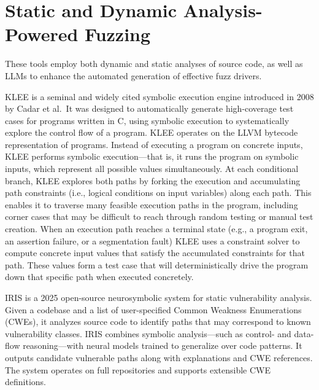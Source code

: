 \documentclass[
  a4paper,
]{scrreprt}
\theoremstyle{definition}
\theoremstyle{remark}
\begin{document}
\section{Static and Dynamic Analysis-Powered
Fuzzing}\label{static-and-dynamic-analysis-powered-fuzzing}

These tools employ both dynamic and static analyses of source code, as
well as LLMs to enhance the automated generation of effective fuzz
drivers.

KLEE \autocite{klee} is a seminal and widely cited symbolic execution
engine introduced in 2008 by Cadar et al.~It was designed to
automatically generate high-coverage test cases for programs written in
C, using symbolic execution to systematically explore the control flow
of a program. KLEE operates on the LLVM \autocite{llvm} bytecode
representation of programs. Instead of executing a program on concrete
inputs, KLEE performs symbolic execution---that is, it runs the program
on symbolic inputs, which represent all possible values simultaneously.
At each conditional branch, KLEE explores both paths by forking the
execution and accumulating path constraints (i.e., logical conditions on
input variables) along each path. This enables it to traverse many
feasible execution paths in the program, including corner cases that may
be difficult to reach through random testing or manual test creation.
When an execution path reaches a terminal state (e.g., a program exit,
an assertion failure, or a segmentation fault) KLEE uses a constraint
solver to compute concrete input values that satisfy the accumulated
constraints for that path. These values form a test case that will
deterministically drive the program down that specific path when
executed concretely.

IRIS \autocite{iris} is a 2025 open-source neurosymbolic system for
static vulnerability analysis. Given a codebase and a list of
user-specified Common Weakness Enumerations (CWEs), it analyzes source
code to identify paths that may correspond to known vulnerability
classes. IRIS combines symbolic analysis---such as control- and
data-flow reasoning---with neural models trained to generalize over code
patterns. It outputs candidate vulnerable paths along with explanations
and CWE references. The system operates on full repositories and
supports extensible CWE definitions.
\end{document}
